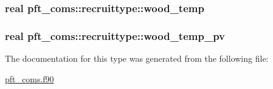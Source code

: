 \subsubsection[{\texorpdfstring{wood\+\_\+temp}{wood_temp}}]{\setlength{\rightskip}{0pt plus 5cm}real pft\+\_\+coms\+::recruittype\+::wood\+\_\+temp}\hypertarget{structpft__coms_1_1recruittype_a39f74782c87f308b9f1578e5f64d2e5f}{}\label{structpft__coms_1_1recruittype_a39f74782c87f308b9f1578e5f64d2e5f}
\subsubsection[{\texorpdfstring{wood\+\_\+temp\+\_\+pv}{wood_temp_pv}}]{\setlength{\rightskip}{0pt plus 5cm}real pft\+\_\+coms\+::recruittype\+::wood\+\_\+temp\+\_\+pv}\hypertarget{structpft__coms_1_1recruittype_a0d5f8dd1bdc575a902052df9d43d26e5}{}\label{structpft__coms_1_1recruittype_a0d5f8dd1bdc575a902052df9d43d26e5}


The documentation for this type was generated from the following file\+:\begin{DoxyCompactItemize}
\item 
\hyperlink{pft__coms_8f90}{pft\+\_\+coms.\+f90}\end{DoxyCompactItemize}
